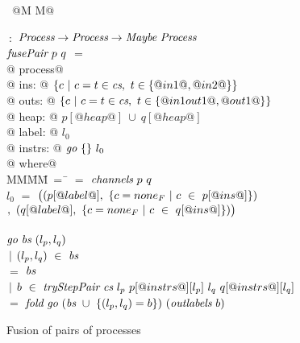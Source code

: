 
\begin{figure}

\begin{tabbing}
~@M M@   \TABDEF \kill

 \> $~:$ \> $\textit{Process} \to \textit{Process} \to  \textit{Maybe}~\textit{Process}$ \\
$\textit{fusePair}~p~q$ \> $=$ \\
@    process@ \\
@        ins: @ $\{ c~|~c=t \in \textit{cs},~t \in \{ @in1@,@in2@ \} \} $ \\
@       outs: @ $\{ c~|~c=t \in \textit{cs},~t \in \{ @in1out1@,@out1@ \} \} $ \\
@       heap: @ $p[@heap@]~\cup~q[@heap@]$ \\
@      label: @ $l_0$ \\
@     instrs: @ $\textit{go}~\{  \}~l_0$ \\
@ where@ \\
MM\=MM\=~=~\=\kill
 \> \cs \> $=$ \> $\textit{channels}~p~q$ \\
 \> $l_0$   \> $=$ \> $
      \big( 
      (p[@label@],~\{ c=none_F~|~c~\in~p[@ins@] \})$
\\ \> \> \>$
    ,~
      (q[@label@],~\{ c=none_F~|~c~\in~q[@ins@] \})
      \big)$ \\
 \\
 \> $\textit{go}~\textit{bs}~(l_p,l_q)$ \\
 \> \> $~|$ \> $(l_p,l_q)~\in~\textit{bs}$ \\
 \> \> $=$  \> $\textit{bs}$ \\
 \> \> $~|$ \>
        $b~\in~\textit{tryStepPair}~\textit{cs}~l_p~p[@instrs@][l_p]~l_q~q[@instrs@][l_q]$ \\ 
 \> \> $=$ \> $\textit{fold}~\textit{go}~(\textit{bs}~\cup~\{ (l_p,l_q)=b \})~(\textit{outlabels}~b)$
\end{tabbing}

\caption{Fusion of pairs of processes}


\label{fig:Fusion:Def:Top}
\end{figure}



